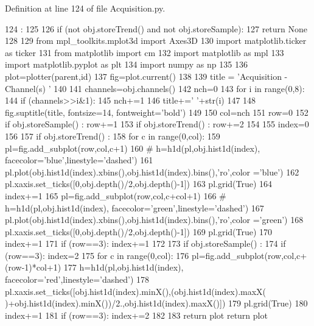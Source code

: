 Definition at line 124 of file Acquisition.py.


\begin{DoxyCode}
124                               :
125     
126     if (not obj.storeTrend() and not obj.storeSample):
127         return None
128     
129     from mpl_toolkits.mplot3d import Axes3D
130     import matplotlib.ticker as ticker
131     from matplotlib import cm
132     import matplotlib as mpl
133     import matplotlib.pyplot as plt
134     import numpy as np
135 
136     plot=plotter(parent,id)
137     fig=plot.current()
138 
139     title = 'Acquisition - Channel(s) '
140 
141     channels=obj.channels()
142     nch=0
143     for i in range(0,8): 
144         if (channels>>i&1): 
145             nch+=1
146             title+=' '+str(i)
147 
148     fig.suptitle(title, fontsize=14, fontweight='bold')
149     
150     col=nch
151     row=0
152     if obj.storeSample() : row+=1
153     if obj.storeTrend() : row+=2
154 
155     index=0
156 
157     if obj.storeTrend() : 
158         for c in range(0,col):
159             pl=fig.add_subplot(row,col,c+1)     
160 #            h=h1d(pl,obj.hist1d(index), facecolor='blue',linestyle='dashed')
161             pl.plot(obj.hist1d(index).xbins(),obj.hist1d(index).bins(),'ro',color
      ='blue')
162             pl.xaxis.set_ticks([0,obj.depth()/2,obj.depth()-1])
163             pl.grid(True)
164             index+=1
165             pl=fig.add_subplot(row,col,c+col+1)     
166 #            h=h1d(pl,obj.hist1d(index), facecolor='green',linestyle='dashed')
167             pl.plot(obj.hist1d(index).xbins(),obj.hist1d(index).bins(),'ro',color
      ='green')
168             pl.xaxis.set_ticks([0,obj.depth()/2,obj.depth()-1])
169             pl.grid(True)
170             index+=1
171             if (row==3): index+=1
172 
173     if obj.storeSample() : 
174         if (row==3): index=2
175         for c in range(0,col):
176             pl=fig.add_subplot(row,col,c+(row-1)*col+1)     
177             h=h1d(pl,obj.hist1d(index), facecolor='red',linestyle='dashed')
178             pl.xaxis.set_ticks([obj.hist1d(index).minX(),(obj.hist1d(index).maxX(
      )+obj.hist1d(index).minX())/2.,obj.hist1d(index).maxX()])
179             pl.grid(True)
180             index+=1
181             if (row==3): index+=2
182 
183     return plot
    return plot
\end{DoxyCode}
